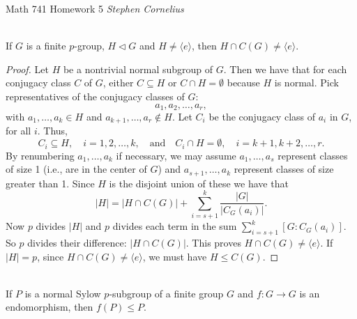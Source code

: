 \documentclass{article}
\begin{document}
\begin{center}
    Math 741
    \hfill Homework 5
    \hfill \textit{Stephen Cornelius}
\end{center}


\begin{problem}[II.5.2] \\
    If $G$ is a finite $p$-group, $H \triangleleft G$ and $H \neq \langle e \rangle$, then $H \cap C(G) \neq \langle e \rangle$.
\end{problem}

\begin{proof}
   Let $H$ be a nontrivial normal subgroup of $G$. Then we have that for each conjugacy class $C$ of $G$, either $C \subseteq H$ or $C \cap H = \emptyset$ because $H$ is normal. Pick representatives of the conjugacy classes of $G$:
   \[
        a_1, a_2, \ldots, a_r,
   \]
   with $a_1, \dots, a_k \in H$ and $a_{k+1}, \ldots, a_r \notin H$. Let $C_i$ be the conjugacy class of $a_i$ in $G$, for all $i$. Thus,
   \[
        C_i \subseteq H, \quad i = 1, 2, \ldots, k, \quad \text{and} \quad C_i \cap H = \emptyset, \quad i = k+1, k+2, \ldots, r.
   \]
   By renumbering $a_1, \dots, a_k$ if necessary, we may assume $a_1, \ldots, a_s$ represent classes of size 1 (i.e., are in the center of $G$) and $a_{s+1}, \ldots, a_k$ represent classes of size greater than 1. Since $H$ is the disjoint union of these we have that 
   \[
        |H| = |H \cap C(G)| + \sum_{i=s+1}^k \frac{|G|}{|C_G(a_i)|}.
   \]
   Now $p$ divides $|H|$ and $p$ divides each term in the sum $\sum_{i=s+1}^k [G : C_G(a_i)]$. So $p$ divides their difference: $|H \cap C(G)|$. This proves $H \cap C(G) \neq \langle e \rangle$. If $|H| = p$, since $H \cap C(G) \neq \langle e \rangle$, we must have $H \leq C(G)$.
\end{proof}


\begin{problem}[II.5.5] \\
    If $P$ is a normal Sylow $p$-subgroup of a finite group $G$ and $f: G \to G$ is an endomorphism, then $f(P) \leq P$.
\end{problem}
\end{document}
